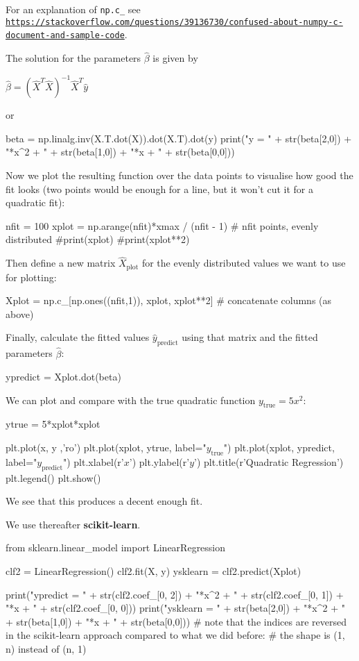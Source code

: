 \documentclass[%
oneside,                 %
final,                   %
10pt]{article}
\begin{document}
For an explanation of \Verb!np.c_! see \href{{https://stackoverflow.com/questions/39136730/confused-about-numpy-c-document-and-sample-code}}{\nolinkurl{https://stackoverflow.com/questions/39136730/confused-about-numpy-c-document-and-sample-code}}.

The solution for the parameters $\hat{\beta}$ is given by

$\hat{\beta} = \left(\hat{X}^T\hat{X}\right)^{-1}\hat{X}^T\hat{y}$

or


\bpycod
beta = np.linalg.inv(X.T.dot(X)).dot(X.T).dot(y)
print("y = " + str(beta[2,0]) + "*x^2 + " + str(beta[1,0]) + "*x + " + str(beta[0,0]))
\epycod

Now we plot the resulting function over the data points to visualise how good the fit looks (two points would be enough for a line, but it won't cut it for a quadratic fit):


\bpycod
nfit = 100
xplot = np.arange(nfit)*xmax / (nfit - 1) # nfit points, evenly distributed
#print(xplot)
#print(xplot**2)
\epycod

Then define a new matrix $\hat{X}_{\mathrm{plot}}$ for the evenly distributed values we want to use for plotting:


\bpycod
Xplot = np.c_[np.ones((nfit,1)), xplot, xplot**2] # concatenate columns (as above)
\epycod

Finally, calculate the fitted values $\hat{y}_{\mathrm{predict}}$ using that matrix and the fitted parameters $\hat{\beta}$:


\bpycod
ypredict = Xplot.dot(beta)
\epycod

We can plot and compare with the true quadratic function $y_{\mathrm{true}} = 5x^2$:


\bpycod
ytrue = 5*xplot*xplot

plt.plot(x, y ,'ro')
plt.plot(xplot, ytrue, label="$y_{\mathrm{true}}$")
plt.plot(xplot, ypredict, label="$y_{\mathrm{predict}}$")
plt.xlabel(r'$x$')
plt.ylabel(r'$y$')
plt.title(r'Quadratic Regression')
plt.legend()
plt.show()
\epycod

We see that this produces a decent enough fit.

We use thereafter \textbf{scikit-learn}.


\bpycod
from sklearn.linear_model import LinearRegression

clf2 = LinearRegression()
clf2.fit(X, y)
ysklearn = clf2.predict(Xplot)

print("ypredict = " + str(clf2.coef_[0, 2]) + "*x^2 + " + str(clf2.coef_[0, 1]) + "*x + " + str(clf2.coef_[0, 0]))
print("ysklearn = " + str(beta[2,0]) + "*x^2 + " + str(beta[1,0]) + "*x + " + str(beta[0,0]))
# note that the indices are reversed in the scikit-learn approach compared to what we did before:
# the shape is (1, n) instead of (n, 1)
\end{document}
